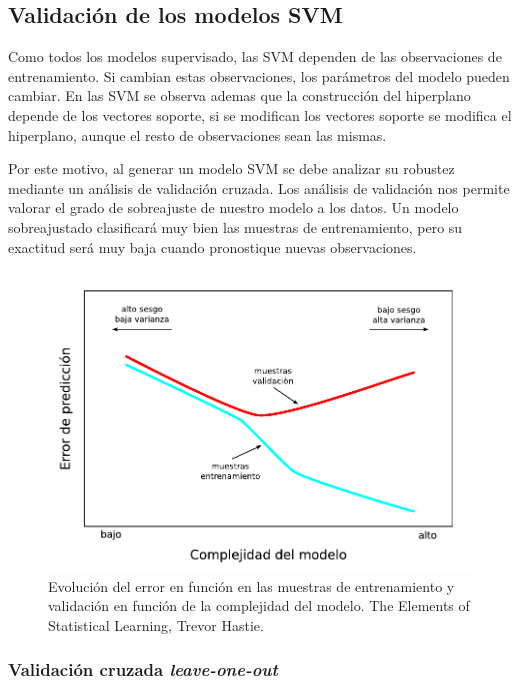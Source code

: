 \documentclass[12pt,spanish,a4paper]{article}
\numberwithin{equation}{section}
\begin{document}
\clearpage

\hypertarget{validacion-de-los-modelos-svm}{%
\subsection{Validación de los modelos
SVM}\label{validacion-de-los-modelos-svm}}

Como todos los modelos supervisado, las SVM dependen de las
observaciones de entrenamiento. Si cambian estas observaciones, los
parámetros del modelo pueden cambiar. En las SVM se observa ademas que
la construcción del hiperplano depende de los vectores soporte, si se
modifican los vectores soporte se modifica el hiperplano, aunque el
resto de observaciones sean las mismas.

Por este motivo, al generar un modelo SVM se debe analizar su robustez
mediante un análisis de validación cruzada. Los análisis de validación
nos permite valorar el grado de sobreajuste de nuestro modelo a los
datos. Un modelo sobreajustado clasificará muy bien las muestras de
entrenamiento, pero su exactitud será muy baja cuando pronostique nuevas
observaciones.

\begin{figure}[h]
\begin{center}
\includegraphics[width=0.9\linewidth]{./figures/complejidad_modelo.pdf}
\caption{Evolución del error en función en las muestras de entrenamiento y validación en función de la complejidad del modelo. The Elements of Statistical Learning, Trevor Hastie.}
\label{fig:complejidad_modelo}
\end{center}
\end{figure}

\hypertarget{validacion-cruzada-leave-one-out}{%
\subsubsection{\texorpdfstring{Validación cruzada
\emph{leave-one-out}}{Validación cruzada leave-one-out}}\label{validacion-cruzada-leave-one-out}}
\end{document}
